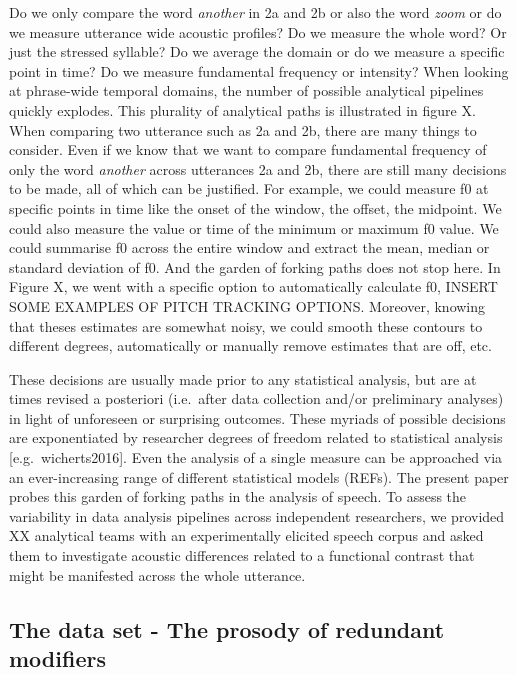 \documentclass[
  english,
  man,floatsintext]{apa6}
\begin{document}
Do we only compare the word \emph{another} in 2a and 2b or also the word \emph{zoom} or do we measure utterance wide acoustic profiles? Do we measure the whole word? Or just the stressed syllable?
Do we average the domain or do we measure a specific point in time?
Do we measure fundamental frequency or intensity?
When looking at phrase-wide temporal domains, the number of possible analytical pipelines quickly explodes.
This plurality of analytical paths is illustrated in figure X.
When comparing two utterance such as 2a and 2b, there are many things to consider.
Even if we know that we want to compare fundamental frequency of only the word \emph{another} across utterances 2a and 2b, there are still many decisions to be made, all of which can be justified.
For example, we could measure f0 at specific points in time like the onset of the window, the offset, the midpoint.
We could also measure the value or time of the minimum or maximum f0 value.
We could summarise f0 across the entire window and extract the mean, median or standard deviation of f0.
And the garden of forking paths does not stop here.
In Figure X, we went with a specific option to automatically calculate f0, INSERT SOME EXAMPLES OF PITCH TRACKING OPTIONS.
Moreover, knowing that theses estimates are somewhat noisy, we could smooth these contours to different degrees, automatically or manually remove estimates that are off, etc.

These decisions are usually made prior to any statistical analysis, but are at times revised a posteriori (i.e.~after data collection and/or preliminary analyses) in light of unforeseen or surprising outcomes.
These myriads of possible decisions are exponentiated by researcher degrees of freedom related to statistical analysis {[}e.g.~wicherts2016{]}.
Even the analysis of a single measure can be approached via an ever-increasing range of different statistical models (REFs).
The present paper probes this garden of forking paths in the analysis of speech.
To assess the variability in data analysis pipelines across independent researchers, we provided XX analytical teams with an experimentally elicited speech corpus and asked them to investigate acoustic differences related to a functional contrast that might be manifested across the whole utterance.

\hypertarget{the-data-set---the-prosody-of-redundant-modifiers}{%
\subsection{The data set - The prosody of redundant modifiers}\label{the-data-set---the-prosody-of-redundant-modifiers}}
\end{document}
